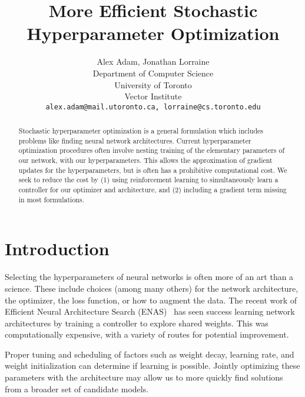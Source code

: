 \documentclass{article}
\title{More Efficient Stochastic Hyperparameter Optimization}
\author{
  Alex Adam, Jonathan Lorraine \\
  Department of Computer Science\\
  University of Toronto\\
  Vector Institute\\
  \texttt{alex.adam@mail.utoronto.ca, lorraine@cs.toronto.edu} \\
}
\begin{document}

\newcommand{\JL}[1]{{\color{blue} #1}}  %
\newcommand{\AlAd}[1]{{\color{red} #1}}  %

\newcommand{\policy}{\pi}  %
\newcommand{\state}[1]{s_{#1}}  %

\maketitle

\begin{abstract}
  Stochastic hyperparameter optimization is a general formulation which includes problems like finding neural network architectures.
  Current hyperparameter optimization procedures often involve nesting training of the elementary parameters of our network, with our hyperparameters.
  This allows the approximation of gradient updates for the hyperparameters, but is often has a prohibitive computational cost.
  We seek to reduce the cost by (1) using reinforcement learning to simultaneously learn a controller for our optimizer and architecture, and (2) including a gradient term missing in most formulations.
\end{abstract}

\section{Introduction}
Selecting the hyperparameters of neural networks is often more of an art than a science.
These include choices (among many others) for the network architecture, the optimizer, the loss function, or how to augment the data.
The recent work of Efficient Neural Architecture Search (ENAS)~\citep{pham2018efficient} has seen success learning network architectures by training a controller to explore shared weights.
This was computationally expensive, with a variety of routes for potential improvement.

Proper tuning and scheduling of factors such as weight decay, learning rate, and weight initialization can determine if learning is possible.
Jointly optimizing these parameters with the architecture may allow us to more quickly find solutions from a broader set of candidate models.
\end{document}
